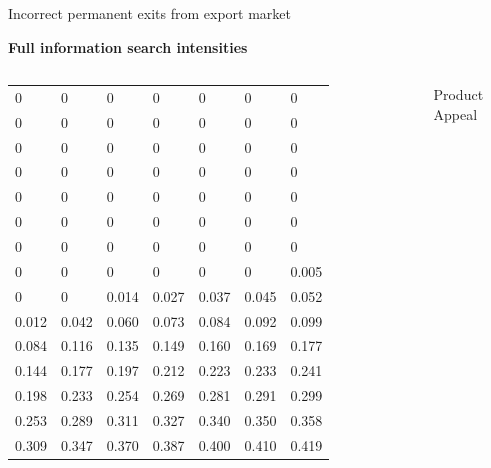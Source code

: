\documentclass[notes=show]{beamer}
\begin{document}
\begin{frame}{Incorrect permanent exits from export market}

    \begin{center}
    \textbf{Full information search intensities}
    \end{center}

    \begin{columns}
            {\footnotesize 
            \begin{tabular}{lllllll}
                0     & 0     & 0     & 0     & 0     & 0     & 0     \\
                0     & 0     & 0     & 0     & 0     & 0     & 0     \\
                0     & 0     & 0     & 0     & 0     & 0     & 0     \\
                0     & 0     & 0     & 0     & 0     & 0     & 0     \\
                0     & 0     & 0     & 0     & 0     & 0     & 0     \\
                0     & 0     & 0     & 0     & 0     & 0     & 0     \\
                0     & 0     & 0     & 0     & 0     & 0     & 0     \\
                0     & 0     & 0     & 0     & 0     & 0     & 0.005 \\
                0     & 0     & 0.014 & 0.027 & 0.037 & 0.045 & 0.052 \\
                0.012 & 0.042 & 0.060 & 0.073 & 0.084 & 0.092 & 0.099 \\
                0.084 & 0.116 & 0.135 & 0.149 & 0.160 & 0.169 & 0.177 \\
                0.144 & 0.177 & 0.197 & 0.212 & 0.223 & 0.233 & 0.241 \\
                0.198 & 0.233 & 0.254 & 0.269 & 0.281 & 0.291 & 0.299 \\
                0.253 & 0.289 & 0.311 & 0.327 & 0.340 & 0.350 & 0.358 \\
                0.309 & 0.347 & 0.370 & 0.387 & 0.400 & 0.410 & 0.419 \\
            \end{tabular}
                }

            \begin{center}
            Product Appeal

            \end{center}
        \end{columns}

\end{frame}
\end{document}
